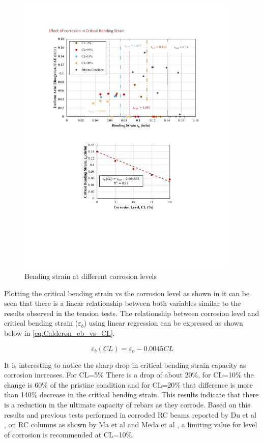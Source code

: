 \begin{figure}[htbp]
	\centering
	\includegraphics[width=0.95\textwidth]{VAC Thesis 2.0/Chapter-4/figs/BBT_results_.pdf}
	\caption{Bending strain at different corrosion levels}
	\label{fig:BBT_strains}
\end{figure}

Plotting the critical bending strain vs the corrosion level as shown in  it can be seen that there is a linear relationship between both variables similar to the results observed in the tension tests. The relationship between corrosion level and critical bending strain ($\varepsilon_{b}$) using linear regression can be expressed as shown below in \ref{eq.Calderon_eb_vs_CL}.

\begin{equation}
    \varepsilon_{b}(CL) = \varepsilon_{o}-0.0045CL
    \label{eq.Calderon_eb_vs_CL}
\end{equation}

It is interesting to notice the sharp drop in critical bending strain capacity as corrosion increases. For CL=5\% There is a drop of about 20\%, for CL=10\% the change is 60\% of the pristine condition and for CL=20\% that difference is more than 140\% decrease in the critical bending strain. This results indicate that there is a reduction in the ultimate capacity of rebars as they corrode. Based on this results and previous tests performed in corroded RC beams reported by Du et al \cite{Du2005}, on RC columns as shown by Ma et al \cite{Ma2012} and Meda et al \cite{Meda2014}, a limiting value for level of corrosion is recommended at CL=10\%.

